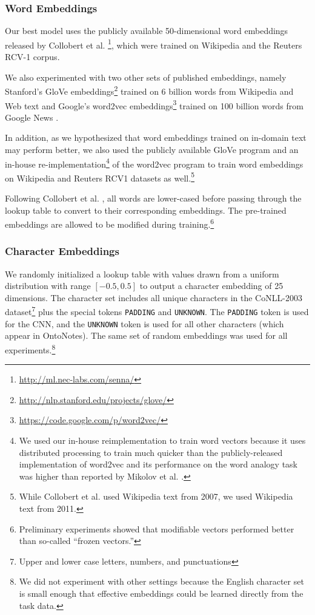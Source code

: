 \documentclass[11pt,letterpaper]{article}
\begin{document}
\subsubsection{Word Embeddings}
Our best model uses the publicly available 50-dimensional word embeddings released by Collobert et al. \footnote{\url{http://ml.nec-labs.com/senna/}}, which were trained on Wikipedia and the Reuters RCV-1 corpus. 

We also experimented with two other sets of published embeddings, namely Stanford's GloVe embeddings\footnote{\url{http://nlp.stanford.edu/projects/glove/}} trained on 6 billion words from Wikipedia and Web text \cite{pennington2014} and Google's word2vec embeddings\footnote{\url{https://code.google.com/p/word2vec/}} trained on 100 billion words from Google News \cite{mikolov2013}.

In addition, as we hypothesized that word embeddings trained on in-domain text may perform better, we also used the publicly available GloVe \cite{pennington2014} program and an in-house re-implementation\footnote{We used our in-house reimplementation to train word vectors because it uses distributed processing to train much quicker than the publicly-released implementation of word2vec and its performance on the word analogy task was higher than reported by Mikolov et al. .} of the word2vec \cite{mikolov2013} program to train word embeddings on Wikipedia and Reuters RCV1 datasets as well.\footnote{While Collobert et al.  used Wikipedia text from 2007, we used Wikipedia text from 2011.}

Following Collobert et al. , all words are lower-cased before passing through the lookup table to convert to their corresponding embeddings. The pre-trained embeddings are allowed to be modified during training.\footnote{Preliminary experiments showed that modifiable vectors performed better than so-called ``frozen vectors.''}

\subsubsection{Character Embeddings}
\label{sec:charvec}
We randomly initialized a lookup table with values drawn from a uniform distribution with range $[-0.5, 0.5]$ to output a character embedding of 25 dimensions. The character set includes all unique characters in the CoNLL-2003 dataset\footnote{Upper and lower case letters, numbers, and punctuations} plus the special tokens {\tt PADDING} and {\tt UNKNOWN}. The {\tt PADDING} token is used for the CNN, and the {\tt UNKNOWN} token is used for all other characters (which appear in OntoNotes). The same set of random embeddings was used for all experiments.\footnote{We did not experiment with other settings because the English character set is small enough that effective embeddings could be learned directly from the task data.}
\end{document}
